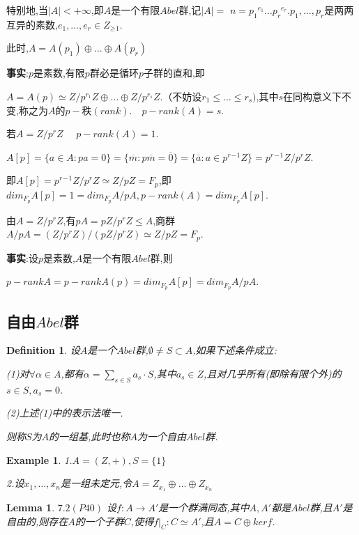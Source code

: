 \documentclass[UTF8]{article}
\newtheorem{defn}{Definition}[section]
\newtheorem{exa}{Example}[section]
\newtheorem{lem}{Lemma}[section]
\begin{document}
特别地,当$|A|<+\infty$,即$A$是一个有限$Abel$群,记$|A|=$ $n=p_1$$^{e_1}$$\dots p_r$$^{e_r}$.$p_1,\dots,p_r$是两两互异的素数,$e_1,\dots,e_r\in Z_\geq$$_1$.

此时,$A=A(p_1)\oplus\dots\oplus A(p_r)$

\textbf{事实}:$p$是素数,有限$p$群必是循环$p$子群的直和,即

$A=A(p)\simeq Z/p^{r_1}Z\oplus\dots\oplus Z/p^{r_s}Z$.（不妨设$r_1\leq\dots\leq r_s)$,其中$s$在同构意义下不变,称之为$A$的$p-$秩$(rank)$.$\quad p-rank(A)=s$.

若$A=Z/p^rZ$  $\quad p-rank(A)=1$.

$A[p]=\{a\in A:pa=0\}=\{\overline m:p\overline m=\overline 0\}=\{\overline a:a\in p^r$$^-$$^1Z\}=p^r$$^-$$^1Z/p^rZ$.

即$A[p]=p^r$$^-$$^1Z/p^rZ\simeq Z/pZ=F_p$,即$dim_{F_p}A[p]=1=dim_{F_p}A/pA,p-rank(A)=dim_{F_p}A[p]$.

由$A=Z/p^rZ$,有$pA=pZ/p^rZ\leq A$,商群$A/pA=(Z/p^rZ)/(pZ/p^rZ)\simeq Z/pZ=F_p$.

\textbf{事实}:设$p$是素数,$A$是一个有限$Abel$群,则
\begin{center}
	$p-rankA=p-rankA(p)=dim_{F_p}A[p]=dim_{F_p}A/pA$.
\end{center}

\subsection{自由$Abel$群}
\normalsize
\begin{defn}
	设$A$是一个$Abel$群,$\emptyset\neq S\subset A$,如果下述条件成立:
	
	(1)对$\forall\alpha\in A$,都有$\alpha=\sum\limits_{s\in S} a_s\cdot S$,其中$a_s\in Z$,且对几乎所有(即除有限个外)的$s\in S,a_s=0$.
	
	(2)上述(1)中的表示法唯一.
	
	则称$S$为$A$的一组基,此时也称$A$为一个自由$Abel$群.
\end{defn}

\begin{exa}
	
	1.$A=(Z,+),S=\{1\}$
	
	2.设$x_1,\dots,x_n$是一组未定元,令$A=Z_{x_1}\oplus\dots\oplus Z_{x_n}$
\end{exa}

\begin{lem}
	\textbf{$7.2(P40)$}
	设$f:A\rightarrow A'$是一个群满同态,其中$A,A'$都是$Abel$群,且$A'$是自由的,则存在$A$的一个子群$C$,使得$f|_C:C\simeq A'$,且$A=C\oplus kerf$.
\end{lem}
\end{document}
